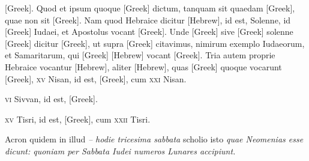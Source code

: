 \begin{parnumbers}
\textgreek{[Greek]}.
\lnr{}Quod
et ipsum quoque \textgreek{[Greek]} dictum, tanquam sit quaedam
 \textgreek{[Greek]},
quae non sit \textgreek{[Greek]}.
\lnr{}Nam quod Hebraice dicitur \texthebrew{[Hebrew]},
id est, Solenne, id \textgreek{[Greek]} Iudaei, et Apostolus vocant
 \textgreek{[Greek]}.
\lnr{}Unde \textgreek{[Greek]} sive \textgreek{[Greek]} solenne \textgreek{[Greek]}
dicitur \textgreek{[Greek]}, ut supra \textgreek{[Greek]} citavimus, nimirum
exemplo Iudaeorum, et Samaritarum, qui \textgreek{[Greek]}
\texthebrew{[Hebrew]} vocant \textgreek{[Greek]}.
\lnr{}Tria autem proprie Hebraice vocantur \texthebrew{[Hebrew]},
aliter \texthebrew{[Hebrew]}, quas \textgreek{[Greek]} quoque vocarunt
 \textgreek{[Greek]}, \textsc{xv} Nisan, id est, \textgreek{[Greek]},
 cum \textsc{xxi} Nisan.

\textsc{vi} Sivvan,
id est, \textgreek{[Greek]}.

\textsc{xv} Tisri, id est, \textgreek{[Greek]}, cum \textsc{xxii} Tisri.

{}
\lnr{}Acron quidem in illud \textit{– hodie tricesima sabbata} scholio isto
\textit{quae Neomenias esse dicunt: quoniam per Sabbata Iudei numeros Lunares
accipiunt.}


\end{parnumbers}
